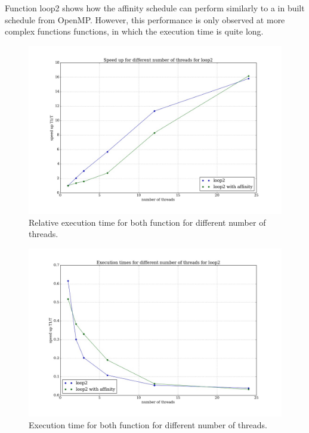 \documentclass[12pt]{article}
\begin{document}
	Function loop2 shows how the affinity schedule can perform similarly to a in built schedule from OpenMP. However, this performance is only observed at more complex functions functions, in which the execution time is quite long.
	
	\begin{figure}[H]	
		\centering
		\includegraphics[scale=0.4]{speed_up_l2.jpeg}
		\caption{Relative execution time for both function for different number of threads.}\label{upl2}
	\end{figure}

	\begin{figure}[H]	
		\centering
		\includegraphics[scale=0.4]{speed_up_l22.jpeg}
		\caption{Execution time for both function for different number of threads.}\label{upl22}
	\end{figure}
	
	
\end{document}

